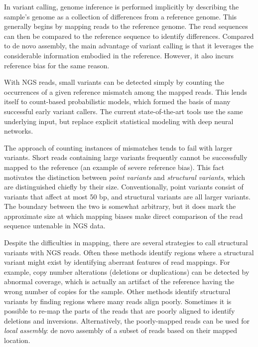 \documentclass[11pt]{ucthesis}
\begin{document}
In variant calling, genome inference is performed implicitly by describing the sample's genome as a collection of differences from a reference genome. This generally begins by mapping reads to the reference genome. The read sequences can then be compared to the reference sequence to identify differences. Compared to de novo assembly, the main advantage of variant calling is that it leverages the considerable information embodied in the reference. However, it also incurs reference bias for the same reason.

With NGS reads, small variants can be detected simply by counting the occurrences of a given reference mismatch among the mapped reads. This lends itself to count-based probabilistic models, which formed the basis of many successful early variant callers\cite{li2009sequence,garrison2012haplotype}. The current state-of-the-art tools use the same underlying input, but replace explicit statistical modeling with deep neural networks\cite{poplin2018universal}. 

The approach of counting instances of mismatches tends to fail with larger variants. Short reads containing large variants frequently cannot be successfully mapped to the reference (an example of severe reference bias). This fact motivates the distinction between \emph{point variants} and \emph{structural variants}, which are distinguished chiefly by their size. Conventionally, point variants consist of variants that affect at most 50 bp, and structural variants are all larger variants. The boundary between the two is somewhat arbitrary, but it does mark the approximate size at which mapping biases make direct comparison of the read sequence untenable in NGS data.

Despite the difficulties in mapping, there are several strategies to call structural variants with NGS reads. Often these methods identify regions where a structural variant might exist by identifying aberrant features of read mappings. For example, copy number alterations (deletions or duplications) can be detected by abnormal coverage, which is actually an artifact of the reference having the wrong number of copies for the sample\cite{abyzov2011cnvnator}. Other methods identify structural variants by finding regions where many reads align poorly. Sometimes it is possible to re-map the parts of the reads that are poorly aligned to identify deletions and inversions\cite{rausch2012delly,layer2014lumpy}. Alternatively, the poorly-mapped reads can be used for \emph{local assembly}: de novo assembly of a subset of reads based on their mapped location\cite{quinlan2010genome,rimmer2014integrating,poplin2018scaling}.
\end{document}
